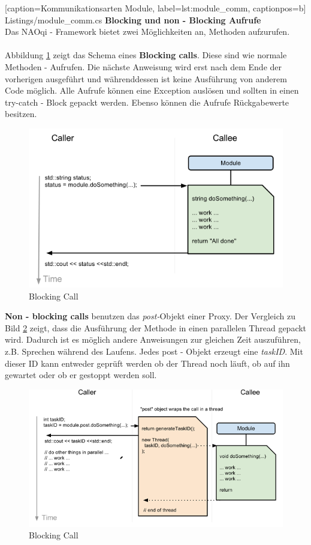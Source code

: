
    [caption={Kommunikationsarten Module},
       label=lst:module_comm,
       captionpos=b]	
 {Listings/module_comm.cs}
\noindent	
\textbf{Blocking und non - Blocking Aufrufe}
\\
Das NAOqi - Framework bietet zwei Möglichkeiten an, Methoden aufzurufen. 
\\
\\
Abbildung \ref{f:naoqi_blockingcall} zeigt das Schema eines \textbf{Blocking calls}. Diese sind wie normale Methoden - Aufrufen. Die nächste Anweisung wird erst nach dem Ende der vorherigen ausgeführt und währenddessen ist keine Ausführung von anderem Code möglich. Alle Aufrufe können eine Exception auslösen und sollten in einen try-catch - Block gepackt werden. Ebenso können die Aufrufe Rückgabewerte besitzen.
\begin{figure}[H]						
	\centering							
	\includegraphics[scale=0.8]{Bilder/blockingcall.PNG}
	\caption{Blocking Call}						
	\label{f:naoqi_blockingcall}						
\end{figure}
\textbf{Non - blocking calls} benutzen das \textit{post-}Objekt einer Proxy. Der Vergleich zu Bild \ref{f:naoqi_nonblockingcall} zeigt, dass die Ausführung der Methode in einen parallelen Thread gepackt wird. Dadurch ist es möglich andere Anweisungen zur gleichen Zeit auszuführen, z.B. Sprechen während des Laufens. Jedes post - Objekt erzeugt eine \textit{taskID}. Mit dieser ID kann entweder geprüft werden ob der Thread noch läuft, ob auf ihn gewartet oder ob er gestoppt werden soll. 
\begin{figure}[H]						
	\centering							
	\includegraphics[scale=0.8]{Bilder/nonblockingcall.PNG}
	\caption{Blocking Call}						
	\label{f:naoqi_nonblockingcall}						
\end{figure}


